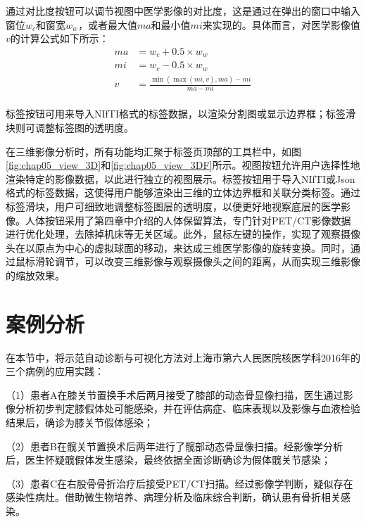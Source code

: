 通过对比度按钮可以调节视图中医学影像的对比度，这是通过在弹出的窗口中输入窗位\(w_c\)和窗宽\(w_w\)，或者最大值\(ma\)和最小值\(mi\)来实现的。具体而言，对医学影像值\(v\)的计算公式如下所示：
\begin{equation}
  \begin{aligned}
    ma & = w_c + 0.5 \times w_w                       \\
    mi & = w_c - 0.5 \times w_w                       \\
    v  & = \frac{\min(\max(mi, v), ma) - mi}{ma - mi} \\
  \end{aligned}
  \label{eq:chap05_constrast}
\end{equation}

标签按钮可用来导入NIfTI格式的标签数据，以渲染分割图或显示边界框；标签滑块则可调整标签图的透明度。

在三维影像分析时，所有功能均汇聚于标签页顶部的工具栏中，如图\ref{fig:chap05_view_3D}和\ref{fig:chap05_view_3DF}所示。视图按钮允许用户选择性地渲染特定的影像数据，以此进行独立的视图展示。标签按钮用于导入NIfTI或Json格式的标签数据，这使得用户能够渲染出三维的立体边界框和关联分类标签。通过标签滑块，用户可细致地调整标签图层的透明度，以便更好地视察底层的医学影像。人体按钮采用了第四章中介绍的人体保留算法，专门针对PET/CT影像数据进行优化处理，去除掉机床等无关区域。此外，鼠标左键的操作，实现了观察摄像头在以原点为中心的虚拟球面的移动，来达成三维医学影像的旋转变换。同时，通过鼠标滑轮调节，可以改变三维影像与观察摄像头之间的距离，从而实现三维影像的缩放效果。

\section{案例分析}

在本节中，将示范自动诊断与可视化方法对上海市第六人民医院核医学科2016年的三个病例的应用实践：

（1）患者A在膝关节置换手术后两月接受了膝部的动态骨显像扫描，医生通过影像分析初步判定膝假体处可能感染，并在评估病症、临床表现以及影像与血液检验结果后，确诊为膝关节假体感染；

（2）患者B在髋关节置换术后两年进行了髋部动态骨显像扫描。经影像学分析后，医生怀疑髋假体发生感染，最终依据全面诊断确诊为假体髋关节感染；

（3）患者C在右股骨骨折治疗后接受PET/CT扫描。经过影像学判断，疑似存在感染性病灶。借助微生物培养、病理分析及临床综合判断，确认患有骨折相关感染。

